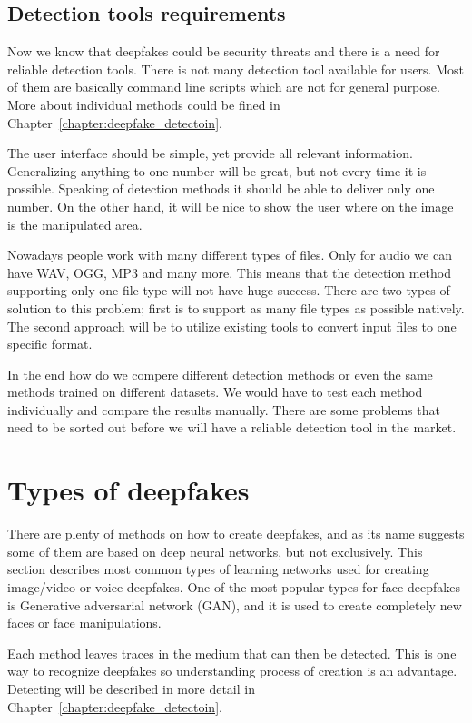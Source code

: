 \section{Detection tools requirements}

Now we know that deepfakes could be security threats and there is a need for reliable detection tools. There is not many detection tool available for users. Most of them are basically command line scripts which are not for general purpose. More about individual methods could be fined in Chapter~\ref{chapter:deepfake_detectoin}.

The user interface should be simple, yet provide all relevant information. Generalizing anything to one number will be great, but not every time it is possible. Speaking of detection methods it should be able to deliver only one number. On the other hand, it will be nice to show the user where on the image is the manipulated area. 

Nowadays people work with many different types of files. Only for audio we can have WAV, OGG, MP3 and many more. This means that the detection method supporting only one file type will not have huge success. There are two types of solution to this problem; first is to support as many file types as possible natively. The second approach will be to utilize existing tools to convert input files to one specific format.

In the end how do we compere different detection methods or even the same methods trained on different datasets. We would have to test each method individually and compare the results manually. There are some problems that need to be sorted out before we will have a reliable detection tool in the market. 

\chapter{Types of deepfakes}
\label{chapter:deepfakes_creation}

There are plenty of methods on how to create deepfakes, and as its name suggests some of them are based on deep neural networks, but not exclusively. This section describes most common types of learning networks used for creating image/video or voice deepfakes. One of the most popular types for face deepfakes is Generative adversarial network (GAN), and it is used to create completely new faces or face manipulations.

Each method leaves traces in the medium that can then be detected. This is one way to recognize deepfakes so understanding process of creation is an advantage. Detecting will be described in more detail in Chapter~\ref{chapter:deepfake_detectoin}.

